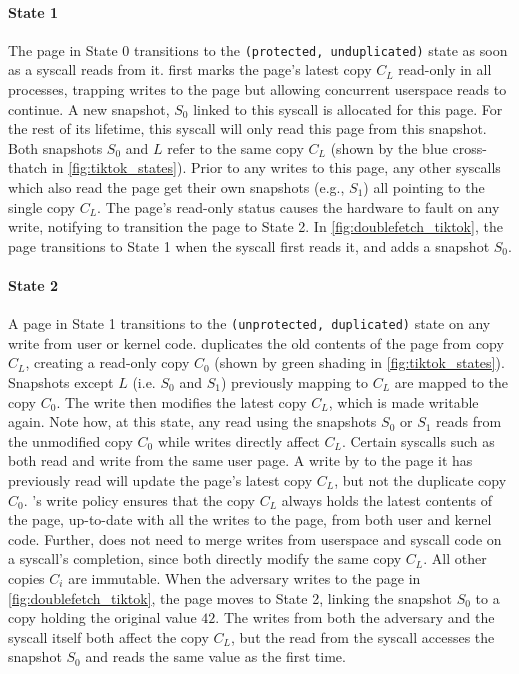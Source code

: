 \documentclass[letterpaper,twocolumn,10pt]{article}
\begin{document}
\paragraph{State 1}
The page in State 0 transitions to the \texttt{(protected, unduplicated)} state as soon as a syscall 
reads from it.
\tiktok first marks the page's latest copy $C_L$ read-only in all processes, 
trapping writes to the page but allowing concurrent userspace reads to continue.
A new snapshot, $S_0$ linked to this syscall is allocated for this page.
For the rest of its lifetime, this syscall will only read this page from this snapshot.
Both snapshots $S_0$ and $L$ refer to the same copy $C_L$ (shown by the 
blue cross-thatch in \autoref{fig:tiktok_states}).
Prior to any writes to this page, any other syscalls which also read the page  
get their own snapshots (e.g., $S_1$) all pointing to the single copy $C_L$.
The page's read-only status causes the hardware to fault on any write,
notifying \tiktok to transition the page to State 2.
In \autoref{fig:doublefetch_tiktok}, the page transitions to State 1 when 
the syscall first reads it, and adds a snapshot $S_0$.

\paragraph{State 2}
A page in State 1 transitions to the \texttt{(unprotected, duplicated)} state 
on any write from user or kernel code.
\tiktok duplicates the old contents of the page from copy $C_L$, creating a 
read-only copy $C_0$ (shown by green shading in \autoref{fig:tiktok_states}).
Snapshots except $L$ (i.e. $S_0$ and $S_1$) previously mapping to $C_L$ are 
mapped to the copy $C_0$.
The write then modifies the latest copy $C_L$, which is made writable again.
Note how, at this state, any read using the snapshots $S_0$ or $S_1$ reads 
from the unmodified copy $C_0$ while writes directly affect $C_L$.
Certain syscalls such as  both read and write from 
the same user page. 
A write by  to the page it has previously read will update
the page's latest copy $C_L$, but not the duplicate copy $C_0$.
\tiktok's write policy ensures that the copy $C_L$ always holds the latest 
contents of the page, up-to-date with all the writes to the page, from both user 
and kernel code. 
Further, \tiktok does not need to merge writes from userspace and syscall code
on a syscall's completion, since both directly modify the same copy $C_L$.
All other copies $C_i$ are immutable.
When the adversary writes to the page in \autoref{fig:doublefetch_tiktok}, the
page moves to State 2, linking the snapshot $S_0$ to a copy holding the 
original value $42$.
The writes from both the adversary and the syscall itself both affect 
the copy $C_L$, but the read from the syscall accesses the snapshot $S_0$
and reads the same value as the first time.
\end{document}
